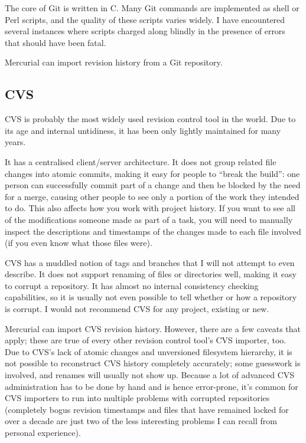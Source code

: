The core of Git is written in C.  Many Git commands are implemented as
shell or Perl scripts, and the quality of these scripts varies widely.
I have encountered several instances where scripts charged along
blindly in the presence of errors that should have been fatal.

Mercurial can import revision history from a Git repository.


\subsection{CVS}

CVS is probably the most widely used revision control tool in the
world.  Due to its age and internal untidiness, it has been only
lightly maintained for many years.

It has a centralised client/server architecture.  It does not group
related file changes into atomic commits, making it easy for people to
``break the build'': one person can successfully commit part of a
change and then be blocked by the need for a merge, causing other
people to see only a portion of the work they intended to do.  This
also affects how you work with project history.  If you want to see
all of the modifications someone made as part of a task, you will need
to manually inspect the descriptions and timestamps of the changes
made to each file involved (if you even know what those files were).

CVS has a muddled notion of tags and branches that I will not attempt
to even describe.  It does not support renaming of files or
directories well, making it easy to corrupt a repository.  It has
almost no internal consistency checking capabilities, so it is usually
not even possible to tell whether or how a repository is corrupt.  I
would not recommend CVS for any project, existing or new.

Mercurial can import CVS revision history.  However, there are a few
caveats that apply; these are true of every other revision control
tool's CVS importer, too.  Due to CVS's lack of atomic changes and
unversioned filesystem hierarchy, it is not possible to reconstruct
CVS history completely accurately; some guesswork is involved, and
renames will usually not show up.  Because a lot of advanced CVS
administration has to be done by hand and is hence error-prone, it's
common for CVS importers to run into multiple problems with corrupted
repositories (completely bogus revision timestamps and files that have
remained locked for over a decade are just two of the less interesting
problems I can recall from personal experience).

